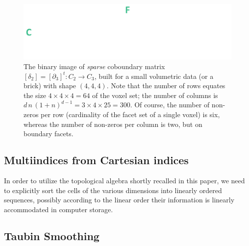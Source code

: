 \begin{figure}[tbp] %
   \centering
   \includegraphics[width=0.75\linewidth]{src/figs/boundary_matrix_4x4x4_desc.pdf} 
   \caption{
   The binary image of \emph{sparse} coboundary matrix  $\left[\delta_2\right] = \left[\partial_3\right]^t : C_2 \to C_3$,
   built for a small volumetric data (or a brick) with shape $(4,4,4)$. Note that the number of rows equates the size $4\times 4\times 4 = 64$ of the voxel set; the number of columns is $d\,n\,(1+n)^{d-1} = 3\times 4\times 25 = 300$. Of course, the number of non-zeros per row (cardinality of the facet set of a single voxel) is six, whereas the number of non-zeros per column is two, but on boundary facets.}
   \label{fig:boundary_matrix_4x4x4}
\end{figure}

\subsection{Multiindices from Cartesian indices}\label{sec:inds-from-cart}

In order to utilize the topological algebra shortly recalled in this paper, we need to explicitly sort the cells of the various dimensions into linearly ordered sequences, possibly according to the linear order their information is linearly accommodated in computer storage. 

\subsection{Taubin Smoothing}\label{sec:taubin}

